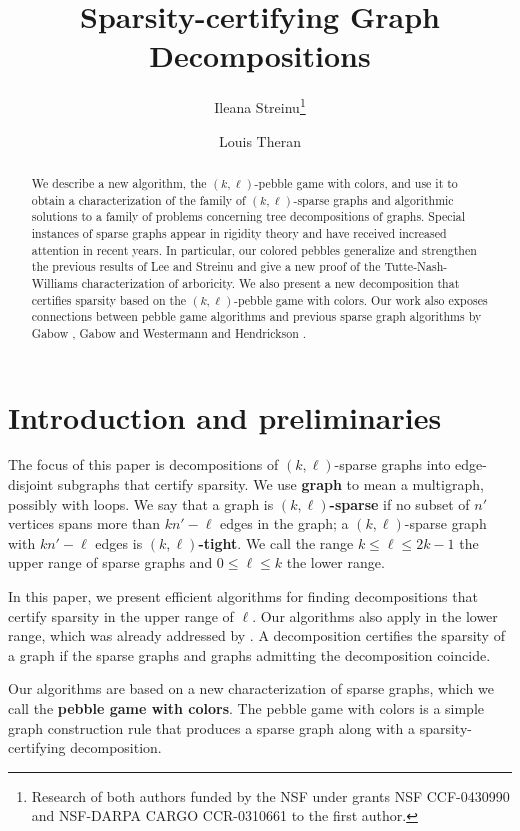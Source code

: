 \documentclass[Svgc,nospthms]{Svgc}
\author{Ileana Streinu\inst{1}\thanks{Research of both authors funded by the NSF under grants NSF CCF-0430990 and NSF-DARPA CARGO CCR-0310661 to the first author.} \and Louis Theran\inst{2}}
\institute{Department of Computer Science, Smith College, Northampton, MA. \email{streinu@cs.smith.edu} 
\and Department of Computer Science, University of Massachusetts Amherst. \email{theran@cs.umass.edu}}
\title{Sparsity-certifying Graph Decompositions}
\begin{document}
	\maketitle
		\begin{abstract}
			We describe a new algorithm, the $(k,\ell)$-pebble game with colors, 
			and use it to obtain a characterization of the family of $(k,\ell)$-sparse graphs 
			and algorithmic solutions to a family of problems concerning tree decompositions of graphs. 
			Special instances of sparse graphs appear in rigidity theory and have received 
			increased attention in recent years. In particular, our colored pebbles generalize 
			and strengthen the previous results of Lee and Streinu \cite{pebblegame} and give a 
			new proof of the Tutte-Nash-Williams characterization of arboricity.  
			We also present a new decomposition that certifies sparsity based on the $(k,\ell)$-pebble 
			game with colors.  Our work also exposes connections between pebble game algorithms and 
			previous sparse graph algorithms by Gabow \cite{gabow:jcss-1995}, Gabow and 
			Westermann \cite{gabow:forests:1992} and Hendrickson
			 \cite{hendrickson:uniqueRealizability:1992}.
		\end{abstract}

		\section{Introduction and preliminaries}

		The focus of this paper
		is decompositions of $(k,\ell)$-sparse graphs into edge-disjoint 
		subgraphs that certify sparsity.  We use {\bf graph} to mean a multigraph, 
		possibly with loops.
		We say that a graph is {\bf $(k,\ell)$-sparse} if no subset of $n'$ vertices 
		spans more than $kn'-\ell$ edges in the graph; a $(k,\ell)$-sparse graph 
		with $kn'-\ell$ edges is {\bf $(k,\ell)$-tight}.
		We call 
		the range $k\le \ell\le 2k-1$ the upper range of sparse graphs
		and $0\le \ell\le k$ the lower range.

		In this paper, we  
		present  efficient algorithms for finding decompositions 
		that certify sparsity in the upper range of $\ell$.  Our algorithms
		also apply in the lower range, which was already addressed by 
		\cite{gabow:jcss-1995,gabow:forests:1992,Ed65,RoTa85,edmonds:matroidpolyhedra}.
	    A decomposition certifies 
		the sparsity of a graph if the sparse graphs and graphs admitting 
		the decomposition coincide.

		Our algorithms are based on a new characterization of sparse graphs, 
		which we call the {\bf pebble game with colors}.  
		The pebble game with colors is a 
		simple graph construction rule that produces a sparse graph along with a 
		sparsity-certifying decomposition.
\end{document}
